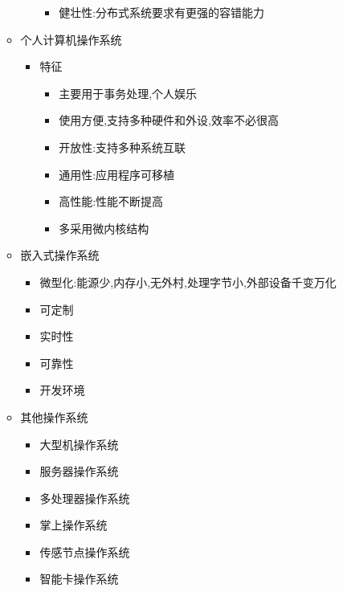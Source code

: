 \documentclass[a4paper,10pt,notitlepage]{article}
\begin{document}
\begin{itemize}
\begin{itemize}
\begin{itemize}
\begin{itemize}
				\item 健壮性:分布式系统要求有更强的容错能力
			\end{itemize}
		\end{itemize}
		\item 个人计算机操作系统
		\begin{itemize}
			\item 特征
			\begin{itemize}
				\item 主要用于事务处理,个人娱乐
				\item 使用方便,支持多种硬件和外设,效率不必很高
				\item 开放性:支持多种系统互联
				\item 通用性:应用程序可移植
				\item 高性能:性能不断提高
				\item 多采用微内核结构
			\end{itemize}
		\end{itemize}
		\item 嵌入式操作系统
		\begin{itemize}
			\item 微型化:能源少,内存小,无外村,处理字节小,外部设备千变万化
			\item 可定制
			\item 实时性
			\item 可靠性
			\item 开发环境
		\end{itemize}
		\item 其他操作系统
		\begin{itemize}
			\item 大型机操作系统
			\item 服务器操作系统
			\item 多处理器操作系统
			\item 掌上操作系统
			\item 传感节点操作系统
			\item 智能卡操作系统
		\end{itemize}
	\end{itemize}
\end{itemize}
\end{document}
